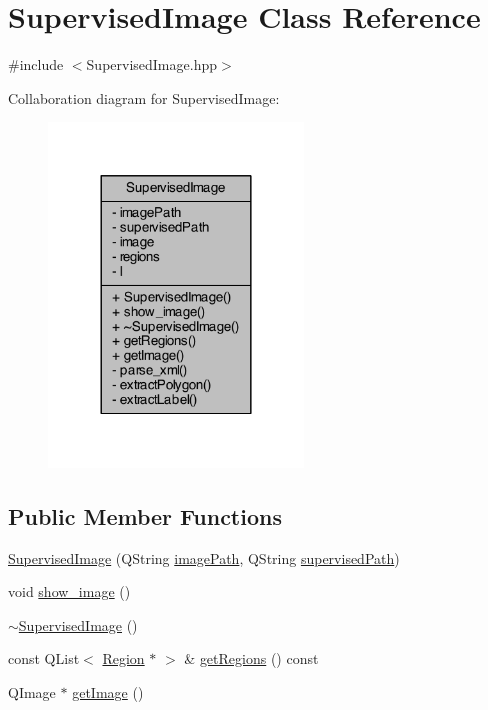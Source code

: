 \hypertarget{class_supervised_image}{\section{Supervised\+Image Class Reference}
\label{class_supervised_image}
}


{\ttfamily \#include $<$Supervised\+Image.\+hpp$>$}



Collaboration diagram for Supervised\+Image\+:\nopagebreak
\begin{figure}[H]
\begin{center}
\leavevmode
\includegraphics[width=192pt]{class_supervised_image__coll__graph}
\end{center}
\end{figure}
\subsection*{Public Member Functions}
\begin{DoxyCompactItemize}
\item 
\hyperlink{class_supervised_image_a032c9ef022d741cfb65c683ed11029ed}{Supervised\+Image} (Q\+String \hyperlink{class_supervised_image_a39f8b0212d2dae489d7b060b0d8dd1b9}{image\+Path}, Q\+String \hyperlink{class_supervised_image_aeeb634f3804dffba600e6aea71fc353e}{supervised\+Path})
\item 
void \hyperlink{class_supervised_image_aa2ab17f3c0be74a99858965e2cddb298}{show\+\_\+image} ()
\item 
\hyperlink{class_supervised_image_a4e9cb98175c10635ff6b4aedb578d70e}{$\sim$\+Supervised\+Image} ()
\item 
const Q\+List$<$ \hyperlink{class_region}{Region} $\ast$ $>$ \& \hyperlink{class_supervised_image_a1ffbba524b28567da37e849f5bb5dbf7}{get\+Regions} () const 
\item 
Q\+Image $\ast$ \hyperlink{class_supervised_image_aaf7160e7c4a85e4c68f36f62e39b6bfa}{get\+Image} ()
\end{DoxyCompactItemize}
